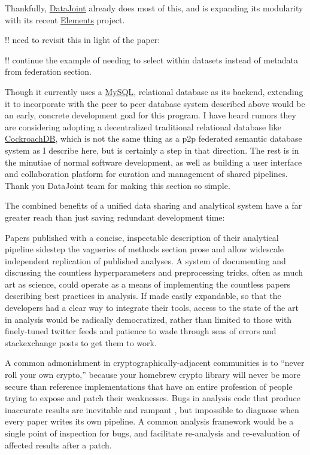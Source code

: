 \documentclass[10pt]{article}
\begin{document}
\begin{multicols}{2}
Thankfully, \href{https://datajoint.io/}{DataJoint} already does most of
this, and is expanding its modularity with its recent
\href{https://github.com/datajoint/datajoint-elements}{Elements}
project.

!! need to revisit this in light of the paper: \cite{yatsenkoDataJointElementsData2021} 

!! continue the example of needing to select within datasets instead of
metadata from federation section.

Though it currently uses a
\href{https://docs.datajoint.io/python/admin/1-hosting.html}{MySQL},
relational database as its backend, extending it to incorporate with the
peer to peer database system described above would be an early, concrete
development goal for this program. I have heard rumors they are
considering adopting a decentralized traditional relational database
like \href{https://www.cockroachlabs.com/product/}{CockroachDB}, which
is not the same thing as a p2p federated semantic database system as I
describe here, but is certainly a step in that direction. The rest is in
the minutiae of normal software development, as well as building a user
interface and collaboration platform for curation and management of
shared pipelines. Thank you DataJoint team for making this section so
simple.

The combined benefits of a unified data sharing and analytical system
have a far greater reach than just saving redundant development time:

Papers published with a concise, inspectable description of their
analytical pipeline sidestep the vagueries of methods section prose and
allow widescale independent replication of published analyses. A system
of documenting and discussing the countless hyperparameters and
preprocessing tricks, often as much art as science, could operate as a
means of implementing the countless papers describing best practices in
analysis. If made easily expandable, so that the developers had a clear
way to integrate their tools, access to the state of the art in analysis
would be radically democratized, rather than limited to those with
finely-tuned twitter feeds and patience to wade through seas of errors
and stackexchange posts to get them to work.

A common admonishment in cryptographically-adjacent communities is to
``never roll your own crypto,'' because your homebrew crypto library
will never be more secure than reference implementations that have an
entire profession of people trying to expose and patch their weaknesses.
Bugs in analysis code that produce inaccurate results are inevitable and
rampant \cite{millerScientistNightmareSoftware2006, soergelRampantSoftwareErrors2015, eklundClusterFailureWhy2016a, bhandarineupaneCharacterizationLeptazolinesPolar2019} , but
impossible to diagnose when every paper writes its own pipeline. A
common analysis framework would be a single point of inspection for
bugs, and facilitate re-analysis and re-evaluation of affected results
after a patch.


\end{multicols}
\end{document}
